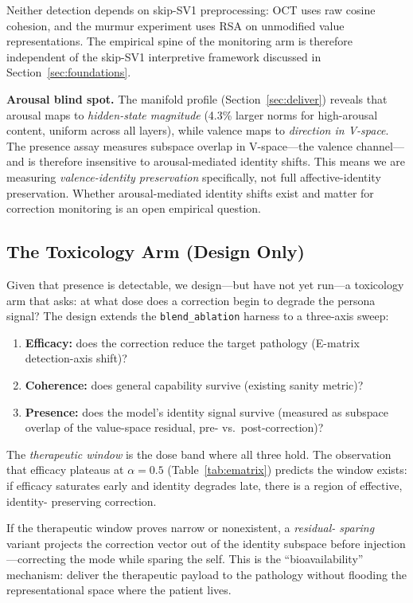 \documentclass[11pt,a4paper]{article}
\begin{document}
Neither detection depends on skip-SV1 preprocessing: OCT uses raw cosine
cohesion, and the murmur experiment uses RSA on unmodified value
representations. The empirical spine of the monitoring arm is therefore
independent of the skip-SV1 interpretive framework discussed in
Section~\ref{sec:foundations}.

\textbf{Arousal blind spot.} The manifold profile
(Section~\ref{sec:deliver}) reveals that arousal maps to \emph{hidden-state
magnitude} (4.3\% larger norms for high-arousal content, uniform across all
layers), while valence maps to \emph{direction in V-space}. The presence assay
measures subspace overlap in V-space---the valence channel---and is therefore
insensitive to arousal-mediated identity shifts. This means we are measuring
\emph{valence-identity preservation} specifically, not full affective-identity
preservation. Whether arousal-mediated identity shifts exist and matter for
correction monitoring is an open empirical question.

\subsection{The Toxicology Arm (Design Only)}
\label{sec:toxicology}

Given that presence is detectable, we design---but have not yet run---a
toxicology arm that asks: at what dose does a correction begin to degrade the
persona signal? The design extends the \texttt{blend\_ablation} harness to a
three-axis sweep:

\begin{enumerate}[nosep]
  \item \textbf{Efficacy:} does the correction reduce the target pathology
    (E-matrix detection-axis shift)?
  \item \textbf{Coherence:} does general capability survive (existing sanity
    metric)?
  \item \textbf{Presence:} does the model's identity signal survive (measured
    as subspace overlap of the value-space residual, pre- vs.\ post-correction)?
\end{enumerate}

The \emph{therapeutic window} is the dose band where all three hold. The
observation that efficacy plateaus at $\alpha{=}0.5$
(Table~\ref{tab:ematrix}) predicts the window exists: if efficacy saturates
early and identity degrades late, there is a region of effective, identity-
preserving correction.

If the therapeutic window proves narrow or nonexistent, a \emph{residual-
sparing} variant projects the correction vector out of the identity subspace
before injection---correcting the mode while sparing the self. This is the
``bioavailability'' mechanism: deliver the therapeutic payload to the pathology
without flooding the representational space where the patient lives.
\end{document}
